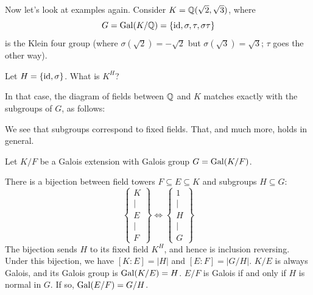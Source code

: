 Now let's look at examples again.
Consider $K = \mathbb Q(\sqrt2, \sqrt3)$,
where \[ G = \operatorname{Gal}(K/\mathbb Q) = \{\mathrm{id}, \sigma, \tau, \sigma\tau\} \]
is the Klein four group
(where $\sigma(\sqrt2) = -\sqrt 2$ but $\sigma(\sqrt 3) = \sqrt 3$; $\tau$ goes the other way).
\begin{ques}
	Let $H = \{\mathrm{id}, \sigma\}$. What is $K^H$?
\end{ques}
In that case, the diagram of fields between $\mathbb Q$ and $K$
matches exactly with the subgroups of $G$, as follows:
\begin{center}
\end{center}
We see that subgroups correspond to fixed fields.
That, and much more, holds in general.

\begin{theorem}
	Let $K/F$ be a Galois extension with Galois group $G = \operatorname{Gal}(K/F)$.
	\begin{enumerate}[(a)]
	\ii There is a bijection between field towers $F \subseteq E \subseteq K$ and subgroups $H \subseteq G$:
	\[
		\left\{
		\begin{array}{c}
			K \\ \mid \\ E \\ \mid \\ F
		\end{array}
		\right\}
		\iff
		\left\{
		\begin{array}{c}
			1 \\ \mid \\ H \\ \mid \\ G
		\end{array}
		\right\}
	\]
	The bijection sends $H$ to its fixed field $K^H$, and hence is inclusion reversing.
	\ii Under this bijection, we have $[K:E] = \left\lvert H \right\rvert$ and $[E:F] = |G/H|$.
	\ii $K/E$ is always Galois, and its Galois group is $\operatorname{Gal}(K/E) = H$.
	\ii $E/F$ is Galois if and only if $H$ is normal in $G$. If so, $\operatorname{Gal}(E/F) = G/H$.
	\end{enumerate}
\end{theorem}

